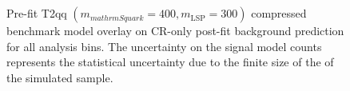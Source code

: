 \begin{figure}[h!]
\begin{center}
{            \label{fig:T2qq_1fold_compressed_MR_4j}
        } \\
         ~~
         \\
        \caption{
            Pre-fit T2qq $(m_{mathrm{Squark}}=400, m_{\mathrm{LSP}}=300)$
            compressed benchmark model overlay on CR-only post-fit background
            prediction for all analysis bins. The uncertainty on the signal
            model counts represents the statistical uncertainty due to the
            finite size of the of the simulated sample.
        }
        \label{fig:T2qq_1fold_compressed_MR}
    \end{center}
\end{figure}


